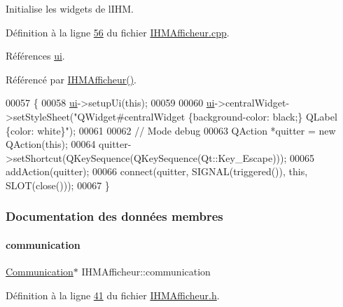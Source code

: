 Initialise les widgets de l\textquotesingle{}I\+HM. 



Définition à la ligne \hyperlink{_i_h_m_afficheur_8cpp_source_l00056}{56} du fichier \hyperlink{_i_h_m_afficheur_8cpp_source}{I\+H\+M\+Afficheur.\+cpp}.



Références \hyperlink{_i_h_m_afficheur_8h_source_l00039}{ui}.



Référencé par \hyperlink{_i_h_m_afficheur_8cpp_source_l00022}{I\+H\+M\+Afficheur()}.


\begin{DoxyCode}
00057 \{
00058     \hyperlink{class_i_h_m_afficheur_a26ca43f1ff87b1caa2191adcce444d23}{ui}->setupUi(\textcolor{keyword}{this});
00059 
00060     \hyperlink{class_i_h_m_afficheur_a26ca43f1ff87b1caa2191adcce444d23}{ui}->centralWidget->setStyleSheet(\textcolor{stringliteral}{"QWidget#centralWidget \{background-color: black;\} QLabel \{color:
       white\}"});
00061 
00062     \textcolor{comment}{// Mode debug}
00063     QAction *quitter = \textcolor{keyword}{new} QAction(\textcolor{keyword}{this});
00064     quitter->setShortcut(QKeySequence(QKeySequence(Qt::Key\_Escape)));
00065     addAction(quitter);
00066     connect(quitter, SIGNAL(triggered()), \textcolor{keyword}{this}, SLOT(close()));
00067 \}
\end{DoxyCode}


\subsubsection{Documentation des données membres}
\mbox{\label{class_i_h_m_afficheur_a331b5544e96cc908336a1486b52c379b}} 
\paragraph{\texorpdfstring{communication}{communication}}
{\footnotesize\ttfamily \hyperlink{class_communication}{Communication}$\ast$ I\+H\+M\+Afficheur\+::communication\hspace{0.3cm}{\ttfamily [private]}}



Définition à la ligne \hyperlink{_i_h_m_afficheur_8h_source_l00041}{41} du fichier \hyperlink{_i_h_m_afficheur_8h_source}{I\+H\+M\+Afficheur.\+h}.



